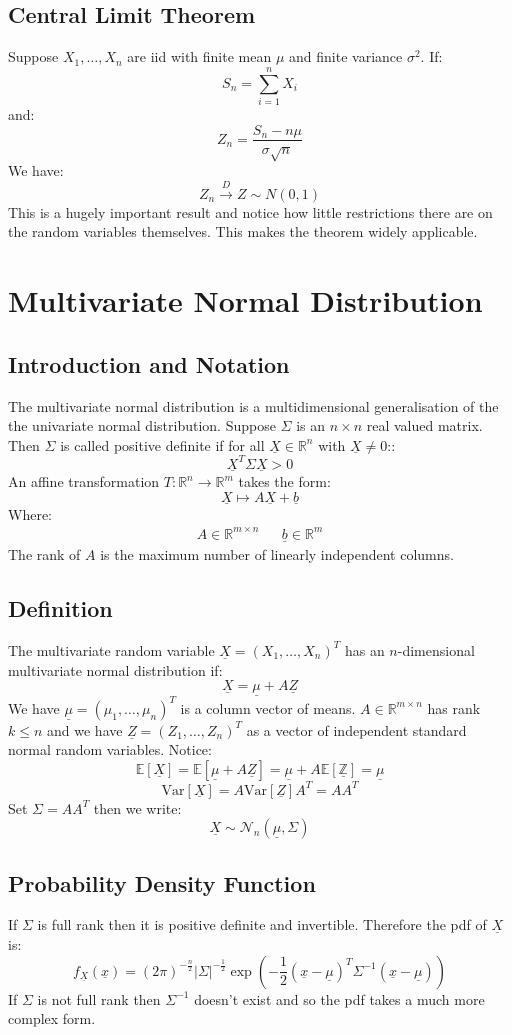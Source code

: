 \documentclass[12pt]{article}
\begin{document}
\subsection{Central Limit Theorem}
Suppose \(X_1,\dots,X_n\) are iid with finite mean \(\mu\) and finite variance \(\sigma^2\). If:
\[S_n=\sum^n_{i=1}X_i\]
and:
\[Z_n=\frac{S_n-n\mu}{\sigma\sqrt{n}}\]
We have:
\[Z_n\overset{D}{\to}Z\sim N(0,1)\]
This is a hugely important result and notice how little restrictions there are on the random variables themselves. This makes the theorem widely applicable.
\clearpage
\section{Multivariate Normal Distribution}
\subsection{Introduction and Notation}
The multivariate normal distribution is a multidimensional generalisation of the the univariate normal distribution. Suppose \(\Sigma\) is an \(n\times n\) real valued matrix. Then \(\Sigma\) is called positive definite if for all \(\underline{X}\in\mathbb{R}^n\) with \(\underline{X}\ne 0\)::
\[\underline{X}^T\Sigma \underline{X}>0\]
An affine transformation \(T:\mathbb{R}^n\to\mathbb{R}^m\) takes the form:
\[\underline{X}\mapsto A\underline{X} +\underline{b}\]
Where:
\begin{align*}
    A\in\mathbb{R}^{m\times n} && \underline{b}\in\mathbb{R}^m
\end{align*}
The rank of \(A\) is the maximum number of linearly independent columns.
\subsection{Definition}
The multivariate random variable \(\underline{X}=(X_1,\dots,X_n)^T\) has an \(n\)-dimensional multivariate normal distribution if:
\[\underline{X}=\underline{\mu}+A\underline{Z}\]
We have \(\underline{\mu}=(\mu_1,\dots,\mu_n)^T\) is a column vector of means. \(A\in\mathbb{R}^{m\times n}\) has rank \(k\leq n\) and we have \(\underline{Z}=(Z_1,\dots,Z_n)^T\) as a vector of independent standard normal random variables. Notice:
\[\mathbb{E}[\underline{X}]=\mathbb{E}[\underline{\mu}+A\underline{Z}]=\underline{\mu}+A\mathbb{E[\underline{Z}]}=\underline{\mu}\]
\[\text{Var}[\underline{X}]=A\text{Var}[\underline{Z}]A^T=AA^T\]
Set \(\Sigma=AA^T\) then we write:
\[\underline{X}\sim \mathcal{N}_n(\underline{\mu},\Sigma)\]
\subsection{Probability Density Function}
If \(\Sigma\) is full rank then it is positive definite and invertible. Therefore the pdf of \(\underline{X}\) is:
\[f_{\underline{X}}(\underline{x})=(2\pi)^{-\frac{n}{2}}|\Sigma|^{-\frac{1}{2}}\exp\left(-\frac{1}{2}(\underline{x}-\underline{\mu})^T\Sigma^{-1}(\underline{x}-\underline{\mu})\right)\]
If \(\Sigma\) is not full rank then \(\Sigma^{-1}\) doesn't exist and so the pdf takes a much more complex form.
\end{document}
